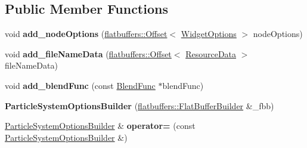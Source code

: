 \subsection*{Public Member Functions}
\begin{DoxyCompactItemize}
\item 
\mbox{\label{structflatbuffers_1_1ParticleSystemOptionsBuilder_ac6cf88ac4c9ddc6a2380102a50404de7}} 
void {\bfseries add\+\_\+node\+Options} (\hyperlink{structflatbuffers_1_1Offset}{flatbuffers\+::\+Offset}$<$ \hyperlink{structflatbuffers_1_1WidgetOptions}{Widget\+Options} $>$ node\+Options)
\item 
\mbox{\label{structflatbuffers_1_1ParticleSystemOptionsBuilder_aaf10b47214ee9e47f8290c4d8f3436ea}} 
void {\bfseries add\+\_\+file\+Name\+Data} (\hyperlink{structflatbuffers_1_1Offset}{flatbuffers\+::\+Offset}$<$ \hyperlink{structflatbuffers_1_1ResourceData}{Resource\+Data} $>$ file\+Name\+Data)
\item 
\mbox{\label{structflatbuffers_1_1ParticleSystemOptionsBuilder_a0b2098f3918f5171a4a7c8eddfd0e61c}} 
void {\bfseries add\+\_\+blend\+Func} (const \hyperlink{structBlendFunc}{Blend\+Func} $\ast$blend\+Func)
\item 
\mbox{\label{structflatbuffers_1_1ParticleSystemOptionsBuilder_a8a0ee935d4cfd31c64e21838d5a989fe}} 
{\bfseries Particle\+System\+Options\+Builder} (\hyperlink{classflatbuffers_1_1FlatBufferBuilder}{flatbuffers\+::\+Flat\+Buffer\+Builder} \&\+\_\+fbb)
\item 
\mbox{\label{structflatbuffers_1_1ParticleSystemOptionsBuilder_a5b8090db41c01faef6117a0d92e031b0}} 
\hyperlink{structflatbuffers_1_1ParticleSystemOptionsBuilder}{Particle\+System\+Options\+Builder} \& {\bfseries operator=} (const \hyperlink{structflatbuffers_1_1ParticleSystemOptionsBuilder}{Particle\+System\+Options\+Builder} \&)
\item 
\mbox{\label{structflatbuffers_1_1ParticleSystemOptionsBuilder_ad3ca7e9ff2e8e2e558508bd36d56a2bb}} 

\end{DoxyCompactItemize}
